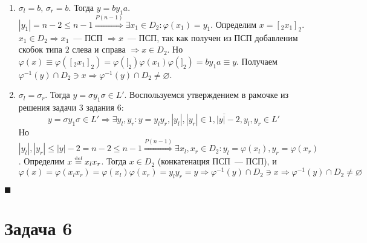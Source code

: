 \documentclass[a4paper]{article}
\def\eqdef{\overset{\mbox{\tiny def}}{=}}
\begin{document}
\begin{enumerate}
\begin{enumerate}
\begin{enumerate}
\item $\sigma_l=b,\,\sigma_r=b$. Тогда $y=by_1a$. $|y_1|=n-2\leqslant n-1\overset{P(n-1)}{\Rightarrow}\exists x_1\in D_2\colon \varphi(x_1)=y_1$. Определим $x=[_2x_1]_2$. $x_1\in D_2\Rightarrow x_1$~--- ПСП $\Rightarrow x$~--- ПСП, так как получен из ПСП добавленим скобок типа $2$ слева и справа $\Rightarrow x\in D_2$. Но $\varphi(x)\equiv\varphi([_2x_1]_2)=\varphi([_2)\varphi(x_1)\varphi(]_2)=by_1a\equiv y$. Получаем $\varphi^{-1}(y)\cap D_2\ni x\Rightarrow \varphi^{-1}(y)\cap D_2\neq\varnothing$.
\item $\sigma_l=\sigma_r$. Тогда $y=\sigma y_1\sigma\in L'$. Воспользуемся утверждением в рамочке из решения задачи 3 задания 6:
$$\boxed{y=\sigma y_1\sigma\in L'\Rightarrow\exists y_l,y_r\colon y=y_ly_r, |y_l|, |y_r|\in\overline{1, |y|-2}, y_l,y_r\in L'}$$
Но $|y_l|,|y_r|\leqslant |y|-2=n-2\leqslant n-1\overset{P(n-1)}{\Rightarrow}\exists x_l,x_r\in D_2\colon y_l=\varphi(x_l),y_r=\varphi(x_r)$. Определим $x\eqdef x_lx_r$. Тогда $x\in D_2$ (конкатенация ПСП~--- ПСП), и $\varphi(x)=\varphi(x_lx_r)=\varphi(x_l)\varphi(x_r)=y_ly_r=y\Rightarrow \varphi^{-1}(y)\cap D_2\ni x\Rightarrow\varphi^{-1}(y)\cap D_2\neq\varnothing$
\end{enumerate}
\end{enumerate}
$\blacksquare$
\end{enumerate}
\section*{Задача 6}
\end{document}

